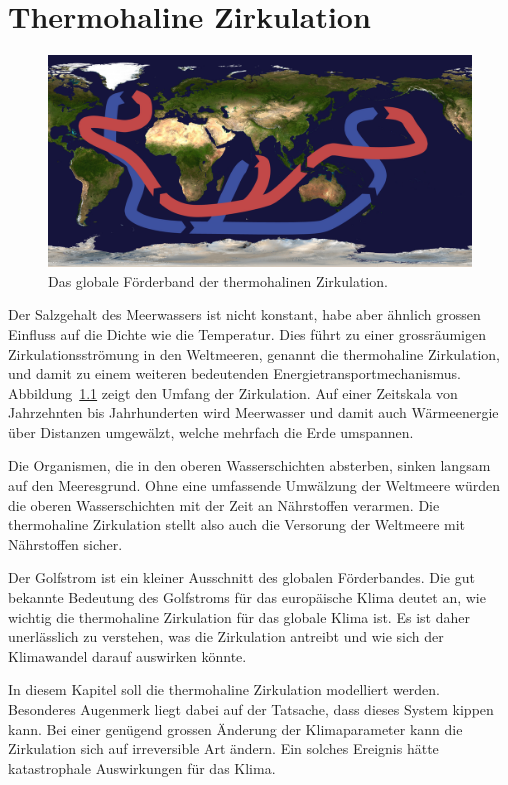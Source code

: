 %
%
%
\chapter{Thermohaline Zirkulation\label{chapter:thc}}
\begin{figure}
\centering
\includegraphics[width=\hsize]{chapters/4/1280px-Thermohaline_circulation.png}
\caption{
Das globale Förderband der thermohalinen Zirkulation.
\label{skript:thc:foerderband}}
\end{figure}%
Der Salzgehalt des Meerwassers ist nicht konstant,
habe aber ähnlich grossen Einfluss auf die Dichte wie die Temperatur.
Dies führt zu einer grossräumigen Zirkulationsströmung in den Weltmeeren,
genannt die thermohaline Zirkulation,
und damit zu einem weiteren bedeutenden Energietransportmechanismus.
Abbildung~\ref{skript:thc:foerderband} zeigt den Umfang der Zirkulation.
Auf einer Zeitskala von Jahrzehnten bis Jahrhunderten wird Meerwasser 
und damit auch Wärmeenergie über Distanzen umgewälzt, welche mehrfach die
Erde umspannen.

Die Organismen, die in den oberen Wasserschichten absterben, sinken langsam
auf den Meeresgrund.
Ohne eine umfassende Umwälzung der Weltmeere würden die oberen Wasserschichten
mit der Zeit an Nährstoffen verarmen.
Die thermohaline Zirkulation stellt also auch die Versorung der
Weltmeere mit Nährstoffen sicher.

Der Golfstrom ist ein kleiner Ausschnitt des globalen Förderbandes.
Die gut bekannte Bedeutung des Golfstroms für das europäische Klima 
deutet an, wie wichtig die thermohaline Zirkulation für das globale
Klima ist.
Es ist daher unerlässlich zu verstehen, was die Zirkulation antreibt und
wie sich der Klimawandel darauf auswirken könnte.

In diesem Kapitel soll die thermohaline Zirkulation modelliert werden.
Besonderes Augenmerk liegt dabei auf der Tatsache, dass dieses System
kippen kann.
Bei einer genügend grossen Änderung der Klimaparameter kann die Zirkulation
sich auf irreversible Art ändern.
Ein solches Ereignis hätte katastrophale Auswirkungen für das Klima.








